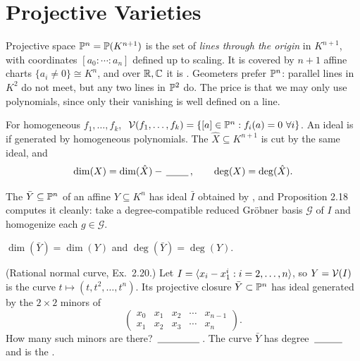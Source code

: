 \section{Projective Varieties}\label{sec:proj}
\quad{}

\begin{strand}
Projective space $\PP^n=\PP(K^{n+1})$ is the set of \emph{lines through the origin} in $K^{n+1}$,
with coordinates $[a_0:\cdots:a_n]$ defined up to scaling. It is covered by $n+1$ affine charts
$\{a_i\ne0\}\cong K^n$, and over $\R,\C$ it is . Geometers prefer $\PP^n$: parallel
lines in $K^2$ do not meet, but any two lines in $\PP^2$ do. The price is that we may only use
 polynomials, since only their vanishing is well defined on a line.
\end{strand}


\begin{definition}
For homogeneous $f_1,\dots,f_k$, $\ \V(f_1,\dots,f_k)=\{[a]\in\PP^n: f_i(a)=0\ \forall i\}$. An ideal is
 if generated by homogeneous polynomials. The  $\hat X\subseteq
K^{n+1}$ is cut by the same ideal, and
\[
  \dim(X)=\dim(\hat X)-\fillin[0.8cm],\qquad \deg(X)=\deg(\hat X).
\]
\end{definition}


The  $\bar Y\subseteq\PP^n$ of an affine $Y\subseteq K^n$ has ideal $\bar I$
obtained by , and Proposition 2.18 computes it cleanly: take a degree-compatible
reduced Gröbner basis $\mathcal G$ of $I$ and homogenize each $g\in\mathcal G$.

\begin{theorem}\label{cor:closure}
$\dim(\bar Y)=\dim(Y)$ and $\deg(\bar Y)=\deg(Y)$.
\end{theorem}

\begin{yourturn}
(Rational normal curve, Ex.\ 2.20.) Let $I=\gen{x_i-x_1^i:i=2,\dots,n}$, so $Y=\V(I)$ is the curve
$t\mapsto(t,t^2,\dots,t^n)$. Its projective closure $\bar Y\subset\PP^n$ has ideal generated by the
$2\times2$ minors of
\[
  \begin{pmatrix} x_0 & x_1 & x_2 & \cdots & x_{n-1}\\ x_1 & x_2 & x_3 & \cdots & x_n \end{pmatrix}.
\]
How many such minors are there? $\fillin[1.5cm]$. The curve $\bar Y$ has degree $\fillin[1cm]$ and is
the . 
\end{yourturn}

